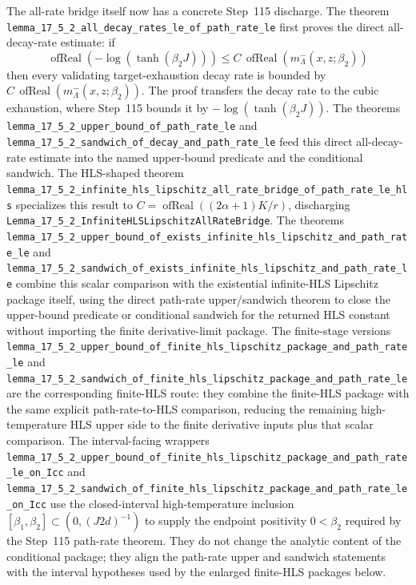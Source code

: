 \documentclass[a4paper,11pt]{article}
\begin{document}
The all-rate bridge itself now has a concrete Step~115 discharge.  The theorem
\texttt{lemma\_17\_5\_2\_all\_decay\_rates\_le\_of\_path\_rate\_le}
first proves the direct all-decay-rate estimate: if
\[
  \operatorname{ofReal}(-\log(\tanh(\beta_2J)))
  \le
  C\,
  \operatorname{ofReal}(m^-_{\Lambda}(x,z;\beta_2))
\]
then every validating target-exhaustion decay rate is bounded by
\(C\,\operatorname{ofReal}(m^-_{\Lambda}(x,z;\beta_2))\).  The proof transfers
the decay rate to the cubic exhaustion, where Step~115 bounds it by
\(-\log(\tanh(\beta_2J))\).  The theorems
\texttt{lemma\_17\_5\_2\_upper\_bound\_of\_path\_rate\_le} and
\texttt{lemma\_17\_5\_2\_sandwich\_of\_decay\_and\_path\_rate\_le} feed this
direct all-decay-rate estimate into the named upper-bound predicate and the
conditional sandwich.  The HLS-shaped theorem
\texttt{lemma\_17\_5\_2\_infinite\_hls\_lipschitz\_all\_rate\_bridge\_of\_path\_rate\_le\_hls}
specializes this result to
\(C=\operatorname{ofReal}((2\alpha+1)K/r)\), discharging
\texttt{Lemma\_17\_5\_2\_InfiniteHLSLipschitzAllRateBridge}.  The theorems
\texttt{lemma\_17\_5\_2\_upper\_bound\_of\_exists\_infinite\_hls\_lipschitz\_and\_path\_rate\_le}
and
\texttt{lemma\_17\_5\_2\_sandwich\_of\_exists\_infinite\_hls\_lipschitz\_and\_path\_rate\_le}
combine this scalar comparison with the existential infinite-HLS Lipschitz
package itself, using the direct path-rate upper/sandwich theorem to close the
upper-bound predicate or conditional sandwich for the returned HLS constant
without importing the finite derivative-limit package.
The finite-stage versions
\texttt{lemma\_17\_5\_2\_upper\_bound\_of\_finite\_hls\_lipschitz\_package\_and\_path\_rate\_le}
and
\texttt{lemma\_17\_5\_2\_sandwich\_of\_finite\_hls\_lipschitz\_package\_and\_path\_rate\_le}
are the corresponding finite-HLS route: they combine the finite-HLS package
with the same explicit path-rate-to-HLS comparison, reducing the remaining
high-temperature HLS upper side to the finite derivative inputs plus that
scalar comparison.
The interval-facing wrappers
\texttt{lemma\_17\_5\_2\_upper\_bound\_of\_finite\_hls\_lipschitz\_package\_and\_path\_rate\_le\_on\_Icc}
and
\texttt{lemma\_17\_5\_2\_sandwich\_of\_finite\_hls\_lipschitz\_package\_and\_path\_rate\_le\_on\_Icc}
use the closed-interval high-temperature inclusion
\([\beta_1,\beta_2]\subset (0,(J2d)^{-1})\) to supply the endpoint positivity
\(0<\beta_2\) required by the Step~115 path-rate theorem.  They do not change
the analytic content of the conditional package; they align the path-rate
upper and sandwich statements with the interval hypotheses used by the enlarged
finite-HLS packages below.
\end{document}

